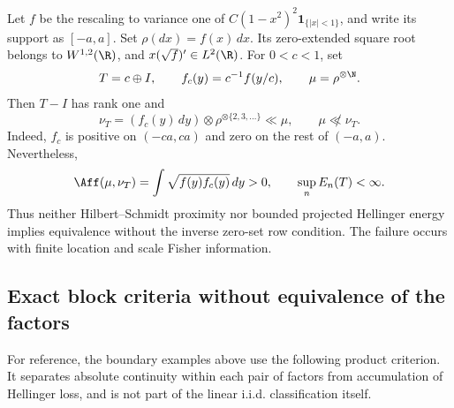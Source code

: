 Let \(f\) be the rescaling to variance one of
\(C(1-x^2)^2\mathbf 1_{\{|x|<1\}}\), and write its support as
\([-a,a]\).
Set \(\rho(dx)=f(x)\,dx\).
Its zero-extended square root belongs to \(W^{1,2}(\R)\), and
\(x(\sqrt f)'\in L^2(\R)\).
For \(0<c<1\), set
\[
 T=c\oplus I,\qquad
 f_c(y)=c^{-1}f(y/c),\qquad \mu=\rho^{\otimes\N}.
\]
Then \(T-I\) has rank one and
\[
 \nu_T=(f_c(y)\,dy)\otimes\rho^{\otimes\{2,3,\ldots\}}\ll\mu,
 \qquad \mu\not\ll\nu_T.
\]
Indeed, \(f_c\) is positive on \((-ca,ca)\) and zero on the rest
of \((-a,a)\).
Nevertheless,
\[
 \Aff(\mu,\nu_T)=\int\sqrt{f(y)f_c(y)}\,dy>0,
 \qquad \sup_n E_n(T)<\infty.
\]
Thus neither Hilbert--Schmidt proximity nor bounded projected Hellinger energy
implies equivalence without the inverse zero-set row condition.
The failure occurs with finite location and scale Fisher information.

\subsection{Exact block criteria without equivalence of the factors}
\label{sec:block-products-without-factor-equivalence}

For reference, the boundary examples above use the following product
criterion.
It separates absolute continuity within each pair of factors from
accumulation of Hellinger loss, and is not part of the linear i.i.d.
classification itself.

